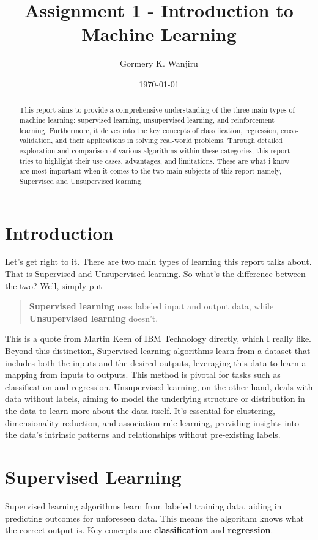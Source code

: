 \documentclass[11pt, a4paper]{article}
\title{Assignment 1 - Introduction to Machine Learning}
\author{Gormery K. Wanjiru}
\date{\today}
\begin{document}
\maketitle

\newpage
\tableofcontents
\newpage
\begin{abstract}
This report aims to provide a comprehensive understanding of the three main types of machine learning: supervised learning, unsupervised learning, and reinforcement learning. Furthermore, it delves into the key concepts of classification, regression, cross-validation, and their applications in solving real-world problems. Through detailed exploration and comparison of various algorithms within these categories, this report tries to highlight their use cases, advantages, and limitations. These are what i know are most important when it comes to the two main subjects of this report namely, Supervised and Unsupervised learning.
\end{abstract}


\section{Introduction}
Let's get right to it. There are two main types of learning this report talks about. That is Supervised and Unsupervised learning. So what's the difference between the two? Well, simply put
\begin{quote}
\textbf{Supervised learning} uses labeled input and output data, while \textbf{Unsupervised learning} doesn't.
\end{quote}
This is a quote from Martin Keen of IBM Technology directly, which I really like. Beyond this distinction, Supervised learning algorithms learn from a dataset that includes both the inputs and the desired outputs, leveraging this data to learn a mapping from inputs to outputs. This method is pivotal for tasks such as classification and regression. Unsupervised learning, on the other hand, deals with data without labels, aiming to model the underlying structure or distribution in the data to learn more about the data itself. It's essential for clustering, dimensionality reduction, and association rule learning, providing insights into the data's intrinsic patterns and relationships without pre-existing labels.
\section{Supervised Learning}
Supervised learning algorithms learn from labeled training data, aiding in predicting outcomes for unforeseen data. This means the algorithm knows what the correct output is. Key concepts are \textbf{classification} and \textbf{regression}.
\end{document}
